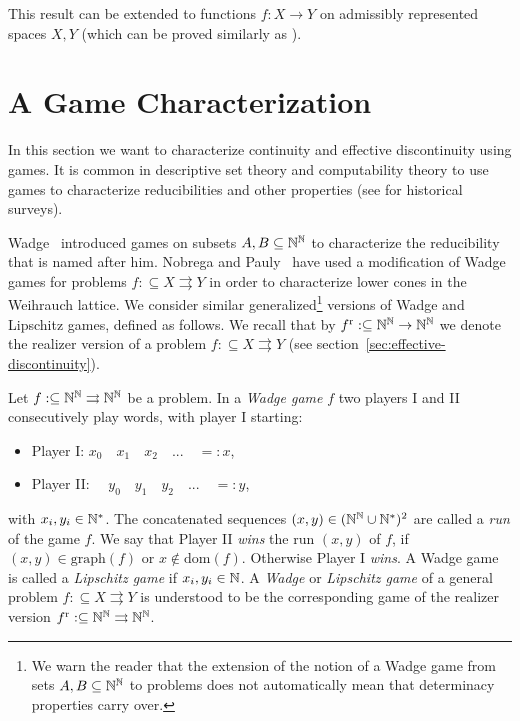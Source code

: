\documentclass{amsart}
\def\IN{{\Bbb{N}}}
\def\In{\subseteq}
\def\mto{\rightrightarrows}
\def\dom{{\mathrm{dom}}}
\def\graph{{\mathrm{graph}}}
\def\r{\mathrm{r}}
\begin{document}
This result can be extended to functions $f:X\to Y$ on admissibly represented spaces $X,Y$ (which can be proved
similarly as \cite[Theorem~4.13]{Pau10a}).


\section{A Game Characterization}
\label{sec:games}

In this section we want to characterize continuity and effective discontinuity using games. 
It is common in descriptive set theory and computability theory to use games to characterize reducibilities and other properties \cite{Kec95,Mos09,Soa16} (see \cite{Tel87,Myc92} for historical surveys).

Wadge~\cite{Wad83} introduced games on subsets $A,B\In\IN^\IN$ to characterize the reducibility that is named after him.
Nobrega and Pauly~\cite{Nob18,NP19} have used a modification of Wadge games for problems $f:\In X\mto Y$ in order to characterize lower cones in the Weihrauch lattice.
We consider similar generalized\footnote{We warn the reader that the extension of the notion of a Wadge game from sets $A,B\In\IN^\IN$
to problems does not automatically mean that determinacy properties carry over.}  versions of Wadge and Lipschitz games, defined as follows. We recall that by ${f^\r:\In\IN^\IN\to\IN^\IN}$ we denote the realizer version
of a problem $f:\In X\mto Y$ (see section~\ref{sec:effective-discontinuity}).

\begin{definition}
Let $f:\In\IN^\IN\mto\IN^\IN$ be a problem. In a {\em Wadge game} $f$
two players I and II consecutively play words, with player I starting:
\begin{itemize}
\item Player I: $x_0\quad  x_1\quad x_2 \quad...\quad=:x$,
\item Player II: $\quad y_0\quad  y_1\quad y_2 \quad...\quad=:y$,
\end{itemize}
with $x_i,y_i\in\IN^*$. 
The concatenated sequences $(x,y)\in(\IN^\IN\cup\IN^*)^2$ are called a {\em run} of the game $f$.
We say that Player II {\em wins} the run $(x,y)$ of $f$, if
$(x,y)\in\graph(f)$ or $x\not\in\dom(f)$. Otherwise Player I {\em wins}. 
A Wadge game is called a {\em Lipschitz game} if $x_i,y_i\in\IN$.
A {\em Wadge} or {\em Lipschitz game} of a general problem $f:\In X\mto Y$ is understood to be the corresponding game of 
the realizer version $f^\r:\In\IN^\IN\mto\IN^\IN$.
\end{definition}
\end{document}
